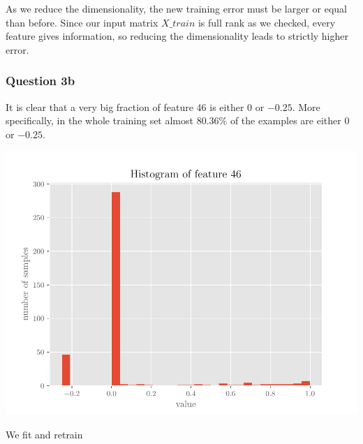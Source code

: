 \documentclass{article}
\begin{document}
As we reduce the dimensionality, the new training error must be larger or equal than before. Since our input matrix $X\_train$ is full rank as we checked, every feature gives information, so reducing the dimensionality leads to strictly higher error.


\subsubsection*{Question 3b}

It is clear that a very big fraction of feature 46 is either $0$ or $-0.25$. More specifically, in the whole training set almost $80.36\%$ of the examples are either $0$ or $-0.25$.

\includegraphics[scale=0.75]{fig_01.pdf}


We fit and retrain
\end{document}
